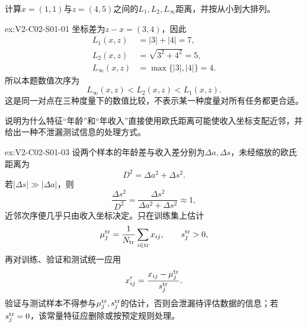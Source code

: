 \begin{SLChapterExercisePairSection}
\SLLectureSupplementExercises

\begin{exercise}\label{ex:V2-C02-S01-01}
计算$x=(1,1)$与$z=(4,5)$之间的$L_1,L_2,L_\infty$距离，并按从小到大排列。
\end{exercise}
\ifSLFullEdition
{}\label{sol:V2-C02-S01-01}
\begin{chapterexercisesolution}{ex:V2-C02-S01-01}
坐标差为$z-x=(3,4)$，因此
\[
\begin{aligned}
L_1(x,z)&=|3|+|4|=7,\\
L_2(x,z)&=\sqrt{3^2+4^2}=5,\\
L_\infty(x,z)&=\max\{|3|,|4|\}=4.
\end{aligned}
\]
所以本题数值次序为
\[
L_\infty(x,z)<L_2(x,z)<L_1(x,z).
\]
这是同一对点在三种度量下的数值比较，不表示某一种度量对所有任务都更合适。
\end{chapterexercisesolution}
\fi

\begin{exercise}\label{ex:V2-C02-S01-03}
说明为什么特征“年龄”和“年收入”直接使用欧氏距离可能使收入坐标支配近邻，并给出一种不泄漏测试信息的处理方式。
\end{exercise}
\ifSLFullEdition
{}\label{sol:V2-C02-S01-03}
\begin{chapterexercisesolution}{ex:V2-C02-S01-03}
设两个样本的年龄差与收入差分别为$\Delta a,\Delta s$，未经缩放的欧氏距离为
\[
D^2=\Delta a^2+\Delta s^2.
\]
若$|\Delta s|\gg|\Delta a|$，则
\[
\frac{\Delta s^2}{D^2}
=\frac{\Delta s^2}{\Delta a^2+\Delta s^2}
\approx1,
\]
近邻次序便几乎只由收入坐标决定。只在训练集上估计
\[
\mu_j^{\rm tr}=\frac1{N_{\rm tr}}\sum_{i\in\rm tr}x_{ij},
\qquad
s_j^{\rm tr}>0,
\]
再对训练、验证和测试统一应用
\[
x'_{ij}=\frac{x_{ij}-\mu_j^{\rm tr}}{s_j^{\rm tr}}.
\]
验证与测试样本不得参与$\mu_j^{\rm tr},s_j^{\rm tr}$的估计，否则会泄漏待评估数据的信息；若$s_j^{\rm tr}=0$，该常量特征应删除或按预定规则处理。
\end{chapterexercisesolution}
\fi


\end{SLChapterExercisePairSection}
